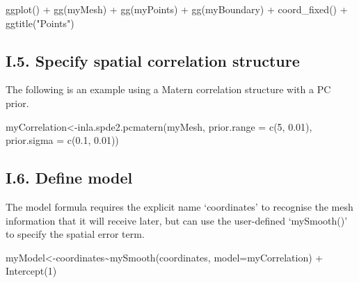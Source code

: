 \documentclass[
]{article}
\newenvironment{Shaded}{\begin{snugshade}}{\end{snugshade}}
\newcommand{\AttributeTok}[1]{\textcolor[rgb]{0.77,0.63,0.00}{#1}}
\newcommand{\DecValTok}[1]{\textcolor[rgb]{0.00,0.00,0.81}{#1}}
\newcommand{\FloatTok}[1]{\textcolor[rgb]{0.00,0.00,0.81}{#1}}
\newcommand{\FunctionTok}[1]{\textcolor[rgb]{0.00,0.00,0.00}{#1}}
\newcommand{\NormalTok}[1]{#1}
\newcommand{\OtherTok}[1]{\textcolor[rgb]{0.56,0.35,0.01}{#1}}
\newcommand{\SpecialCharTok}[1]{\textcolor[rgb]{0.00,0.00,0.00}{#1}}
\newcommand{\StringTok}[1]{\textcolor[rgb]{0.31,0.60,0.02}{#1}}
\begin{document}
\begin{Shaded}
\begin{Highlighting}[]
\FunctionTok{ggplot}\NormalTok{() }\SpecialCharTok{+}
  \FunctionTok{gg}\NormalTok{(myMesh) }\SpecialCharTok{+}
  \FunctionTok{gg}\NormalTok{(myPoints) }\SpecialCharTok{+}
  \FunctionTok{gg}\NormalTok{(myBoundary) }\SpecialCharTok{+}
  \FunctionTok{coord\_fixed}\NormalTok{() }\SpecialCharTok{+}
  \FunctionTok{ggtitle}\NormalTok{(}\StringTok{"Points"}\NormalTok{)}
\end{Highlighting}
\end{Shaded}

\hypertarget{i.5.-specify-spatial-correlation-structure}{%
\subsection{I.5. Specify spatial correlation
structure}\label{i.5.-specify-spatial-correlation-structure}}

The following is an example using a Matern correlation structure with a
PC prior.

\begin{Shaded}
\begin{Highlighting}[]
\NormalTok{myCorrelation}\OtherTok{\textless{}{-}}\FunctionTok{inla.spde2.pcmatern}\NormalTok{(myMesh, }\AttributeTok{prior.range =} \FunctionTok{c}\NormalTok{(}\DecValTok{5}\NormalTok{, }\FloatTok{0.01}\NormalTok{), }\AttributeTok{prior.sigma =} \FunctionTok{c}\NormalTok{(}\FloatTok{0.1}\NormalTok{, }\FloatTok{0.01}\NormalTok{))}
\end{Highlighting}
\end{Shaded}

\hypertarget{i.6.-define-model}{%
\subsection{I.6. Define model}\label{i.6.-define-model}}

The model formula requires the explicit name `coordinates' to recognise
the mesh information that it will receive later, but can use the
user-defined `mySmooth()' to specify the spatial error term.

\begin{Shaded}
\begin{Highlighting}[]
\NormalTok{myModel}\OtherTok{\textless{}{-}}\NormalTok{coordinates}\SpecialCharTok{\textasciitilde{}}\FunctionTok{mySmooth}\NormalTok{(coordinates, }\AttributeTok{model=}\NormalTok{myCorrelation) }\SpecialCharTok{+} \FunctionTok{Intercept}\NormalTok{(}\DecValTok{1}\NormalTok{)}
\end{Highlighting}
\end{Shaded}
\end{document}
